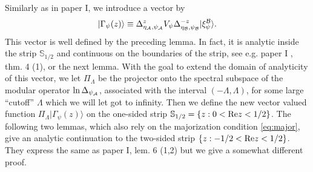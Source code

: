 \documentclass[english,a4paper,12pt]{article}
\def\bS{{\mathbb S}}
\def\cA{{\mathfrak A}}
\def\cB{{\mathfrak B}}
\newcommand{\ca}[1]{{\cal #1}}
\newcommand{\ben}{\begin{equation}}
\newcommand{\een}{\end{equation}}
\def\cA{{\ca A}}
\def\cB{{\ca B}}
\renewcommand{\log}{\operatorname{ln}}
\renewcommand{\Re}{{\rm Re}}
\begin{document}
Similarly as in paper I, we introduce a vector by
\ben\label{eq:G}
|\Gamma_\psi(z)\rangle \equiv   \Delta_{\eta_\cA,\psi_\cA}^{z} V_\psi  \Delta_{\eta_\cB,\psi_\cB}^{-z} |\xi_{\psi}^{\cB}\rangle.  
\een
This vector is well defined by the preceding lemma. In fact, it is analytic inside the strip $\bS_{1/2}$ and continuous 
on the boundaries of the strip, see e.g. paper I  \cite{Faulkner:2020iou}, thm. 4 (1), or the next lemma.  With the goal to extend the domain of analyticity of this vector, we let
$\Pi_\Lambda$ be the projector onto the spectral subspace of the modular operator $\log \Delta_{\psi_\cA}$, associated with the interval $(-\Lambda,\Lambda)$, for some large ``cutoff'' $\Lambda$ which 
we will let got to infinity. Then we define the new vector valued function $\Pi_\Lambda |\Gamma_\psi(z)\rangle$ on the one-sided strip $\bS_{1/2}=\{z: 0<\Re z<1/2\}$. 
The following two lemmas, which also rely on the majorization condition \eqref{eq:major}, give 
an analytic continuation to the two-sided strip $\{z: -1/2<\Re z<1/2\}$. They express the same 
as paper I, lem. 6 (1,2) but we give a somewhat different proof. 
\end{document}
